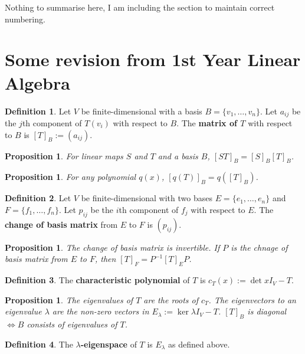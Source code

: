 \documentclass[12pt]{article}
\newtheorem{prop}[thm]{Proposition}
\newtheorem*{prop*}{Proposition}
\theoremstyle{definition}
\newtheorem*{defn*}{Definition}
\begin{document}
\noindent Nothing to summarise here, I am including the section to maintain correct numbering.

\section{Some revision from 1st Year Linear Algebra}

\begin{defn*}
	Let $V$ be finite-dimensional with a basis $B = \{v_1, \ldots, v_n\}$.
	Let $a_{ij}$ be the $j$th component of $T(v_i)$ with respect to $B$.
	The \textbf{matrix of $T$} with respect to $B$ is $[T]_B := (a_{ij})$.
\end{defn*}

\begin{prop}
	For linear maps $S$ and $T$ and a basis $B$, $[ST]_B = [S]_B[T]_B$.
\end{prop}

\begin{prop*}
	For any polynomial $q(x)$, $[q(T)]_B = q([T]_B)$.
\end{prop*}

\begin{defn*}
	Let $V$ be finite-dimensional with two bases $E = \{e_1, \ldots, e_n\}$ and $F = \{f_1, \ldots, f_n\}$.
	Let $p_{ij}$ be the $i$th component of $f_j$ with respect to $E$.
	The \textbf{change of basis matrix} from $E$ to $F$ is $(p_{ij})$.
\end{defn*}

\begin{prop}
	The change of basis matrix is invertible.
	If $P$ is the chnage of basis matrix from $E$ to $F$, then $[T]_F = P^{-1}[T]_EP$.
\end{prop}

\begin{defn*}
	The \textbf{characteristic polynomial} of $T$ is $c_T(x) := \det{xI_V - T}$.
\end{defn*}

\begin{prop}
	The eigenvalues of $T$ are the roots of $c_T$.
	The eigenvectors to an eigenvalue $\lambda$ are the non-zero vectors in $E_{\lambda} := \ker{\lambda I_V - T}$.
	$[T]_B$ is diagonal $\iff B$ consists of eigenvalues of $T$.
\end{prop}

\begin{defn*}
	The \textbf{$\lambda$-eigenspace} of $T$ is $E_{\lambda}$ as defined above.
\end{defn*}
\end{document}
